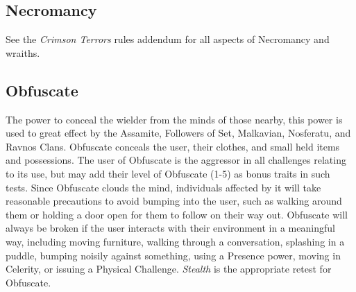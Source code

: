 \subsection{Necromancy}
See the \emph{Crimson Terrors} rules addendum for all aspects of Necromancy and wraiths.

\subsection{Obfuscate}
The power to conceal the wielder from the minds of those nearby, this power is used to great 
effect by the Assamite, Followers of Set, Malkavian, Nosferatu, and Ravnos Clans.  Obfuscate conceals 
the user, their clothes, and small held items and possessions.  The user of Obfuscate is the aggressor 
in all challenges relating to its use, but may add their level of Obfuscate (1-5) as bonus traits in 
such tests.  Since Obfuscate clouds the mind, individuals affected by it will take reasonable precautions 
to avoid bumping into the user, such as walking around them or holding a door open for them to follow on 
their way out.  Obfuscate will always be broken if the user interacts with their environment in a 
meaningful way, including moving furniture, walking through a conversation, splashing in a puddle, bumping 
noisily against something, using a Presence power, moving in Celerity, or issuing a Physical Challenge.  
\emph{Stealth} is the appropriate retest for Obfuscate.

